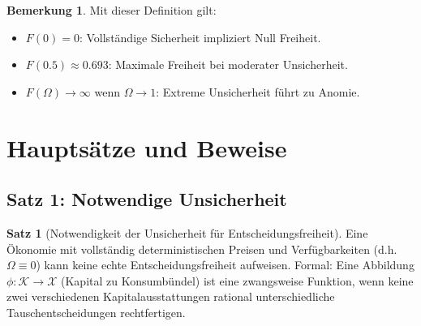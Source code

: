\documentclass[a4paper, 12pt, twoside, openright]{report}
\theoremstyle{definition}
\theoremstyle{definition}
\newtheorem{satz}{Satz}[chapter]
\newtheorem{bemerkung}{Bemerkung}[chapter]
\begin{document}
\begin{bemerkung}
    Mit dieser Definition gilt:
    \begin{itemize}
        \item $F(0) = 0$: Vollständige Sicherheit impliziert Null Freiheit.
        \item $F(0.5) \approx 0.693$: Maximale Freiheit bei moderater Unsicherheit.
        \item $F(\Omega) \to \infty$ wenn $\Omega \to 1$: Extreme Unsicherheit führt zu Anomie.
    \end{itemize}
\end{bemerkung}

\section{Hauptsätze und Beweise}

\subsection{Satz 1: Notwendige Unsicherheit}

\begin{satz}[Notwendigkeit der Unsicherheit für Entscheidungsfreiheit]
    \label{satz:notwendige_unsicherheit}
    Eine Ökonomie mit vollständig deterministischen Preisen und Verfügbarkeiten (d.h. $\Omega \equiv 0$) kann keine echte Entscheidungsfreiheit aufweisen. Formal: Eine Abbildung $\phi: \mathcal{K} \to \mathcal{X}$ (Kapital zu Konsumbündel) ist eine zwangsweise Funktion, wenn keine zwei verschiedenen Kapitalausstattungen rational unterschiedliche Tauschentscheidungen rechtfertigen.
\end{satz}
\end{document}
